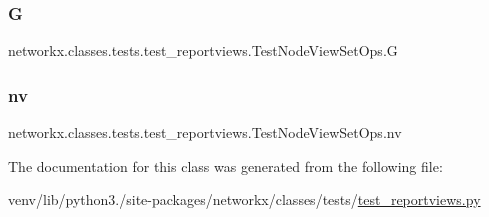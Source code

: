 \subsubsection{\texorpdfstring{G}{G}}
{\footnotesize\ttfamily networkx.\+classes.\+tests.\+test\+\_\+reportviews.\+Test\+Node\+View\+Set\+Ops.\+G}

\mbox{\label{classnetworkx_1_1classes_1_1tests_1_1test__reportviews_1_1TestNodeViewSetOps_a9830dc57718d5e3552058a5a8dc5a376}} 
\subsubsection{\texorpdfstring{nv}{nv}}
{\footnotesize\ttfamily networkx.\+classes.\+tests.\+test\+\_\+reportviews.\+Test\+Node\+View\+Set\+Ops.\+nv}



The documentation for this class was generated from the following file\+:\begin{DoxyCompactItemize}
\item 
venv/lib/python3./site-\/packages/networkx/classes/tests/\hyperlink{test__reportviews_8py}{test\+\_\+reportviews.\+py}\end{DoxyCompactItemize}
